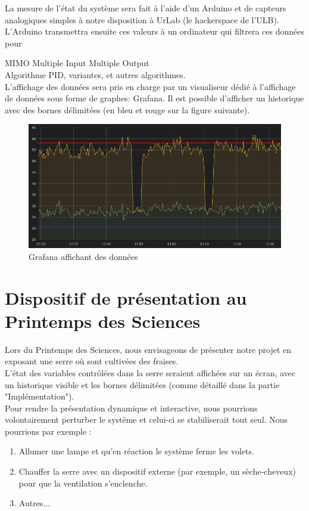 \documentclass[a4paper,10pt]{article}
\begin{document}
La mesure de l'état du système sera fait à l'aide d'un Arduino et de capteurs analogiques simples à notre disposition à UrLab (le hackerspace de l'ULB). L'Arduino transmettra ensuite ces valeurs à un ordinateur qui filtrera ces données pour

MIMO Multiple Input Multiple Output \\

Algorithme PID, variantes, et autres algorithmes.\\

L'affichage des données sera pris en charge par un visualiseur dédié à l'affichage de données sous forme de graphes: Grafana. Il est possible d'afficher un historique avec des bornes délimitées (en bleu et rouge sur la figure suivante). \\

\thispagestyle{empty}
\begin{figure}[H]
\centering
\includegraphics[scale=0.5]{figures/Grafana.png}
\caption{Grafana affichant des données}
\label{grafana}
\end{figure}

\section{Dispositif de présentation au Printemps des Sciences}

Lors du Printemps des Sciences, nous envisageons de présenter notre projet en exposant une serre où sont cultivées des fraises. \\

L'état des variables contrôlées dans la serre seraient affichées sur un écran, avec un historique visible et les bornes délimitées (comme détaillé dans la partie "Implémentation"). \\

Pour rendre la présentation dynamique et interactive, nous pourrions volontairement perturber le système et celui-ci se stabiliserait tout seul. Nous pourrions par exemple :
\begin{enumerate}
	\item Allumer une lampe et qu'en réaction le système ferme les volets.
	\item Chauffer la serre avec un dispositif externe (par exemple, un sèche-cheveux) pour que la ventilation s'enclenche.
	\item Autres... \\
\end{enumerate}
\end{document}
